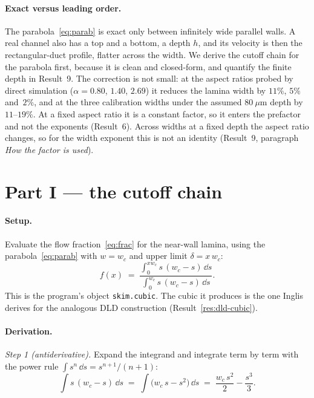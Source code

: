 \paragraph{Exact versus leading order.} The parabola~\eqref{eq:parab} is exact only between
infinitely wide parallel walls. A real channel also has a top and a bottom, a depth $h$, and
its velocity is then the rectangular-duct profile, flatter across the width. We derive the
cutoff chain for the parabola first, because it is clean and closed-form, and quantify the
finite depth in Result~9. The correction is not small: at the aspect ratios probed by direct
simulation ($\alpha=0.80$, $1.40$, $2.69$) it reduces the lamina width by $11\%$, $5\%$
and~$2\%$, and at the three calibration widths under the assumed $80~\mu$m depth by
$11$--$19\%$. At a fixed aspect ratio it is a constant factor, so it enters the prefactor and
not the exponents (Result~6). Across widths at a fixed depth the aspect ratio changes, so for
the width exponent this is not an identity (Result~9, paragraph \emph{How the factor is used}).

\section{Part I --- the cutoff chain}
\label{sec:part1}

\label{res:skim-cubic}

\paragraph{Setup.} Evaluate the flow fraction~\eqref{eq:frac} for the near-wall lamina, using
the parabola~\eqref{eq:parab} with $w=w_c$ and upper limit $\delta=x\,w_c$:
\begin{equation}
f(x) \;=\; \frac{\displaystyle\int_0^{x w_c} s\,(w_c - s)\,\dd s}{\displaystyle\int_0^{w_c} s\,(w_c - s)\,\dd s}.
\end{equation}
This is the program's object \texttt{skim.cubic}. The cubic it produces is the one Inglis
derives for the analogous DLD construction \cite{b17} (Result~\ref{res:dld-cubic}).

\paragraph{Derivation.}
\emph{Step 1 (antiderivative).} Expand the integrand and integrate term by term with the
power rule $\int s^n\,\dd s = s^{n+1}/(n+1)$:
\begin{equation}
\int s\,(w_c - s)\,\dd s \;=\; \int \big(w_c\,s - s^2\big)\,\dd s \;=\; \frac{w_c\,s^2}{2} - \frac{s^3}{3}.
\end{equation}

